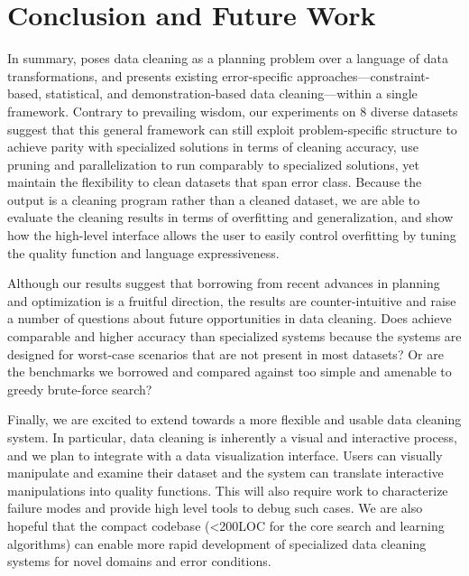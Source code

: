 \section{Conclusion and Future Work}
In summary, \sys poses data cleaning as a planning problem over a language of data transformations, and presents existing error-specific approaches---constraint-based, statistical, and demonstration-based data cleaning---within a single framework.
Contrary to prevailing wisdom, our experiments on 8 diverse datasets suggest that this general framework can still exploit problem-specific structure to achieve parity with specialized solutions in terms of cleaning accuracy, use pruning and parallelization to run comparably to specialized solutions, yet maintain the flexibility to clean datasets that span error class.       
Because the output is a cleaning program rather than a cleaned dataset, we are able to evaluate the cleaning results in terms of overfitting and generalization, and show how the high-level interface allows the user to easily control overfitting by tuning the quality function and language expressiveness.  

Although our results suggest that borrowing from recent advances in planning and optimization is a fruitful direction, the results are counter-intuitive and raise a number of questions about future opportunities in data cleaning.  Does \sys achieve comparable and higher accuracy than specialized systems because the systems are designed for worst-case scenarios that are not present in most datasets?  Or are the benchmarks we borrowed and compared against too simple and amenable to greedy brute-force search?   

Finally, we are excited to extend \sys towards a more flexible and usable data cleaning system.  In particular, data cleaning is inherently a visual and interactive process, and we plan to integrate \sys with a data visualization interface.   Users can visually manipulate and examine their dataset and the system can translate interactive manipulations into quality functions.  This will also require work to characterize failure modes and provide high level tools to debug such cases.  We are also hopeful that the compact codebase (<200LOC for the core search and learning algorithms) can enable more rapid development of specialized data cleaning systems for novel domains and error conditions.  


